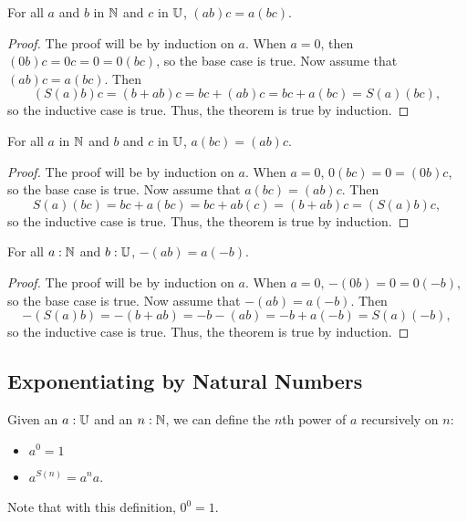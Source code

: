 \documentclass[../math.tex]{subfiles}
\begin{document}
\begin{theorem}
    For all $a$ and $b$ in $\mathbb{N}$ and $c$ in $\mathbb{U}$, $(ab)c = a(bc)$.
\end{theorem}
\begin{proof}
    The proof will be by induction on $a$.  When $a = 0$, then $(0b)c = 0c = 0 =
    0(bc)$, so the base case is true.  Now assume that $(ab)c = a(bc)$.
    Then
    \[
        (S(a)b)c = (b + ab)c = bc + (ab)c = bc + a(bc) = S(a)(bc),
    \]
    so the inductive case is true.  Thus, the theorem is true by induction.
\end{proof}

\begin{theorem}
    For all $a$ in $\mathbb{N}$ and $b$ and $c$ in $\mathbb{U}$, $a(bc) = (ab)c$.
\end{theorem}
\begin{proof}
    The proof will be by induction on $a$.  When $a = 0$, $0(bc) = 0 = (0b)c$,
    so the base case is true.  Now assume that $a(bc) = (ab)c$.  Then
    \[
        S(a)(bc) = bc + a(bc) = bc + ab(c) = (b + ab)c = (S(a)b)c,
    \]
    so the inductive case is true.  Thus, the theorem is true by induction.
\end{proof}

\begin{theorem}
    For all $a : \mathbb{N}$ and $b : \mathbb{U}$, $-(ab) = a(-b)$.
\end{theorem}
\begin{proof}
    The proof will be by induction on $a$.  When $a = 0$, $-(0b) = 0 = 0(-b)$,
    so the base case is true.  Now assume that $-(ab) = a(-b)$.  Then
    \[
        -(S(a)b) = -(b + ab) = -b - (ab) = -b + a(-b) = S(a)(-b),
    \]
    so the inductive case is true.  Thus, the theorem is true by induction.
\end{proof}

\subsection{Exponentiating by Natural Numbers}

\begin{definition}
    Given an $a : \mathbb{U}$ and an $n : \mathbb{N}$, we can define the $n$th power of $a$
    recursively on $n$:
    \begin{itemize}
        \item $a^0 = 1$
        \item $a^{S(n)} = a^na$.
    \end{itemize}
    Note that with this definition, $0^0 = 1$.
\end{definition}
\end{document}
